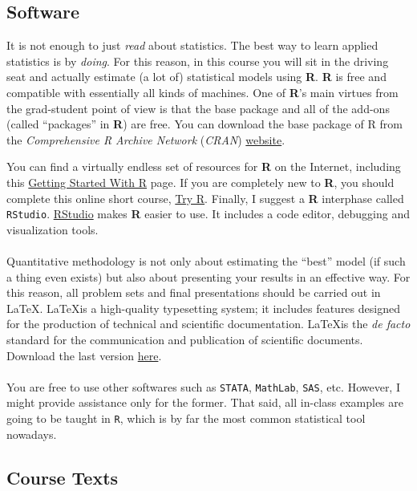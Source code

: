 \documentclass[letterpaper]{article}
\begin{document}
\subsection*{Software}

It is not enough to just \emph{read} about statistics. The best way to learn applied statistics is by \emph{doing}. For this reason, in this course you will sit in the driving seat and actually estimate (a lot of) statistical models using {\bf R}. {\bf R} is free and compatible with essentially all kinds of machines. One of {\bf R}'s main virtues from the grad-student point of view is that the base package and all of the add-ons (called ``packages'' in {\bf R}) are free. You can download the base package of R from the \emph{Comprehensive R Archive Network} (\emph{CRAN}) \href{http://www.cran.r-project.org}{website}.  

You can find a virtually endless set of resources for {\bf R} on the Internet, including this \href{http://scs.math.yorku.ca/index.php/R:_Getting_started_with_R}{Getting Started With R} page. If you are completely new to {\bf R}, you should complete this online short course, \href{http://tryr.codeschool.com/}{Try R}. Finally, I suggest a {\bf R} interphase called \texttt{RStudio}. \href{https://www.rstudio.com/products/rstudio/download/}{RStudio} makes {\bf R} easier to use. It includes a code editor, debugging and visualization tools.
\\
\\
Quantitative methodology is not only about estimating the ``best'' model (if such a thing even exists) but also about presenting your results in an effective way. For this reason, all problem sets and final presentations should be carried out in \LaTeX. \LaTeX is a high-quality typesetting system; it includes features designed for the production of technical and scientific documentation. \LaTeX is the \emph{de facto} standard for the communication and publication of scientific documents. Download the last version \href{https://www.latex-project.org/get/}{here}.
\\
\\
You are free to use other softwares such as \texttt{STATA}, \texttt{MathLab}, \texttt{SAS}, etc. However, I might provide assistance only for the former. That said, all in-class examples are going to be taught in \texttt{R}, which is by far the most common statistical tool nowadays. 

\subsection*{Course Texts}
\end{document}
